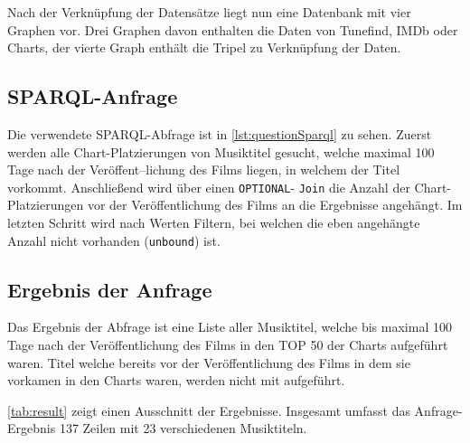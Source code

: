 \documentclass[parskip]{scrartcl}
\begin{document}
Nach der Verknüpfung der Datensätze liegt nun eine Datenbank mit vier Graphen vor. Drei Graphen davon enthalten die Daten von Tunefind, IMDb oder Charts, der vierte Graph enthält die Tripel zu Verknüpfung der Daten.

\subsection{SPARQL-Anfrage}

Die verwendete SPARQL-Abfrage ist in \autoref{lst:questionSparql} zu sehen. Zuerst werden alle Chart-Platzierungen von Musiktitel gesucht, welche maximal 100 Tage nach der Veröffent--lichung des Films liegen, in welchem der Titel vorkommt. Anschließend wird über einen \texttt{OPTIONAL}- \texttt{Join} die Anzahl der Chart-Platzierungen vor der Veröffentlichung des Films an die Ergebnisse angehängt. Im letzten Schritt wird nach Werten Filtern, bei welchen die eben angehängte Anzahl nicht vorhanden (\texttt{unbound}) ist.

\subsection{Ergebnis der Anfrage} 

Das Ergebnis der Abfrage ist eine Liste aller Musiktitel, welche bis maximal 100 Tage nach der Veröffentlichung des Films in den TOP 50 der Charts aufgeführt waren. Titel welche bereits vor der Veröffentlichung des Films in dem sie vorkamen in den Charts waren, werden nicht mit aufgeführt.

\autoref{tab:result} zeigt einen Ausschnitt der Ergebnisse. Insgesamt umfasst das Anfrage-Ergebnis 137 Zeilen mit 23 verschiedenen Musiktiteln.
\end{document}
